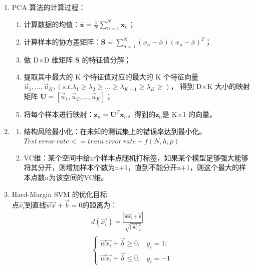 \documentclass[a4paper,11pt,onecolumn,oneside,UTF8]{article}
\begin{document}
\begin{enumerate}
    \item
          PCA 算法的计算过程：\\
          \begin{enumerate}[(1)]
              \item 计算数据的均值：$\bar{\boldsymbol{x}} = \frac{1}{N}\sum \limits_{n=1}^N\boldsymbol{x}_n$；
              \item 计算样本的协方差矩阵：$\mathbf{S}=\sum \limits_{n=1}^N\left(x_n-\bar x\right)\left(x_n-\bar x\right)^T$；
              \item 做 D×D 维矩阵 $\mathbf{S}$ 的特征值分解；
              \item 提取其中最大的 K 个特征值对应的最大的 K 个特征向量 $\vec{u}_1,...,\vec{u}_K,\left(s.t. \lambda_1 \geq \lambda_2 \geq ...\geq \lambda_{K-1} \geq \lambda_{K} \geq \right)$，
                    得到 D×K 大小的映射矩阵 $\mathbf{U} = \left[\vec{u}_1,\vec{u}_2,...,\vec{u}_K\right]$；
              \item 将每个样本进行映射：$\boldsymbol{z}_n = \mathbf{U}^T\boldsymbol{x}_n$，得到的$\boldsymbol{z}_n$是 K×1 的向量。
          \end{enumerate}
    \item
          \begin{enumerate}[(1)]
              \item 结构风险最小化：在未知的测试集上的错误率达到最小化。$Test\ error\ rate <= train\ error\ rate + f(N, h, p)$
              \item VC维：某个空间中给n个样本点随机打标签，如果某个模型足够强大能够将其分开，则增加样本个数为n+1，直到不能分开n+1，则这个最大的样本点数n为该空间的VC维。
          \end{enumerate}
    \item
          Hard-Margin SVM 的优化目标\\
          点$\vec{x_i}$到直线$\vec{w}\vec{x}+\vec{b}=0$的距离为：
          $$
              \begin{aligned}
                  d\left(\vec{x_i}\right) = \frac{|\vec{w}\vec{x_i}+\vec{b}|}{\sqrt{||\vec{w}||_2^2}} \\
                  \left\{\begin{array}{ll}
                      \vec{w}\vec{x_i}+\vec{b}\geq 0, & y_i=1; \\
                      \vec{w}\vec{x_i}+\vec{b}\leq 0, & y_i=-1
                  \end{array}
                  \right.
              \end{aligned}
$$
\end{enumerate}
\end{document}
